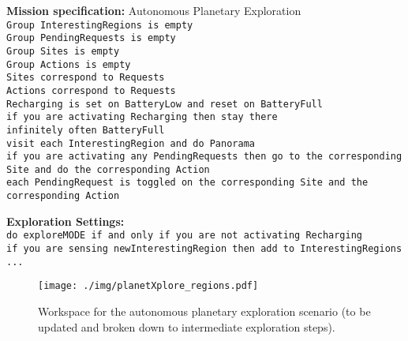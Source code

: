 \begin{algorithm}
	\textbf{Mission specification:} Autonomous Planetary Exploration\\
	{\small
	\texttt{Group InterestingRegions is empty}\\
	\texttt{Group PendingRequests is empty}\\
	\texttt{Group Sites is empty}\\
	\texttt{Group Actions is empty}\\
	
	\texttt{Sites correspond to Requests}\\
	\texttt{Actions correspond to Requests}\\
	
	\texttt{Recharging is set on BatteryLow and reset on BatteryFull}\\
	\texttt{if you are activating Recharging then stay there}\\
	\texttt{infinitely often BatteryFull}\\
	
	\texttt{visit each InterestingRegion and do Panorama}\\
	\texttt{if you are activating any PendingRequests then go to the corresponding Site and do the corresponding Action}\\
	\texttt{each PendingRequest is toggled on the corresponding Site and the corresponding Action}\\
	}
	
	\textbf{Exploration Settings:}\\
	{\small
	\texttt{do exploreMODE if and only if you are not activating Recharging}\\
	\texttt{if you are sensing newInterestingRegion then add to InterestingRegions}\\
	\texttt{...} 
	}
\end{algorithm}

\begin{figure}[h]
	\centering
	\texttt{[image: ./img/planetXplore\_regions.pdf]}
	\caption{Workspace for the autonomous planetary exploration scenario (to be updated and broken down to intermediate exploration steps).}
	\label{Fig:planetxplore}
\end{figure}

